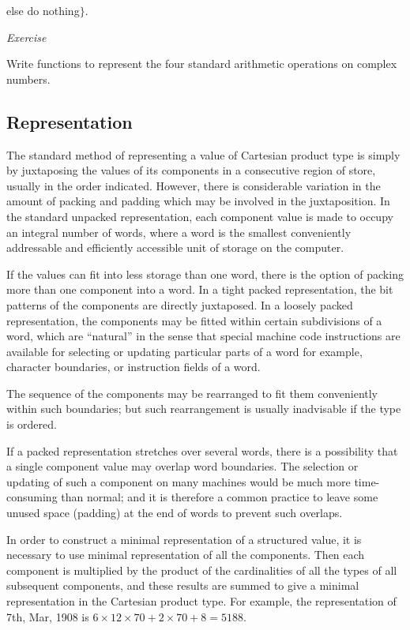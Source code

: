 \quad \quad \quad else do nothing$\}$.

\noindent
\textit{Exercise}
\nopagebreak

\noindent
Write functions to represent the four standard arithmetic operations on complex numbers.

\subsection{Representation}
\label{sec:representation-4-2}

The standard method of representing a value of Cartesian product type is simply by juxtaposing the values of its components in a consecutive region of store, usually in the order indicated. However, there is considerable variation in the amount of packing and padding which may be involved in the juxtaposition. In the standard unpacked representation, each component value is made to occupy an integral number of words, where a word is the smallest conveniently addressable and efficiently accessible unit of storage on the computer.

If the values can fit into less storage than one word, there is the option of packing more than one component into a word. In a tight packed representation, the bit patterns of the components are directly juxtaposed. In a loosely packed representation, the components may be fitted within certain subdivisions of a word, which are ``natural'' in the sense that special machine code instructions are available for selecting or updating particular parts of a word \textemdash{} for example, character boundaries, or instruction fields of a word.

The sequence of the components may be rearranged to fit them conveniently within such boundaries; but such rearrangement is usually inadvisable if the type is ordered.

If a packed representation stretches over several words, there is a possibility that a single component value may overlap word boundaries. The selection or updating of such a component on many machines would be much more time-consuming than normal; and it is therefore a common practice to leave some unused space (padding) at the end of words to prevent such overlaps.

In order to construct a minimal representation of a structured value, it is necessary to use minimal representation of all the components. Then each component is multiplied by the product of the cardinalities of all the types of all subsequent components, and these results are summed to give a minimal representation in the Cartesian product type. For example, the representation of 7th, Mar, 1908 is $6\times 12\times 70 + 2\times 70 + 8 = 5188$.

